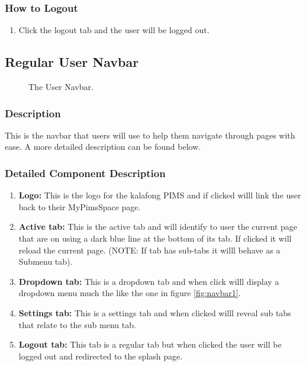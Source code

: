 \documentclass[14pt, a4paper]{article}
\begin{document}
	\subsubsection{How to Logout}
		\begin{enumerate}
			\item Click the logout tab and the user will be logged out.
		\end{enumerate}
\subsection {Regular User Navbar}
	\begin{figure}[H]
		\caption{The User Navbar.}
  		\label{fig:navbar4}
	\end{figure}
	\subsubsection{Description} This is the navbar that users will use to help them navigate through pages with ease. A more detailed description can be found below.
	\subsubsection{Detailed Component Description}
		\begin{enumerate}
			\item \textbf{Logo:} This is the logo for the kalafong PIMS and if clicked willl link the user back to their MyPimsSpace page.
			\item \textbf{Active tab:} This is the active tab and will identify to user the current page that are on using a dark blue line at the bottom of its tab. If clicked it will reload the current page. (NOTE: If tab has sub-tabs it willl behave as a Submenu tab).
			\item \textbf{Dropdown tab: } This is a dropdown tab and when click willl display a dropdown menu much the like the one in figure \ref{fig:navbar1}.
			\item \textbf{Settings tab:} This is a settings tab and when clicked willl reveal sub tabs that relate to the sub menu tab.
			\item \textbf{Logout tab:} This tab is a regular tab but when clicked the user will be logged out and redirected to the splash page.
		\end{enumerate}
\end{document}
